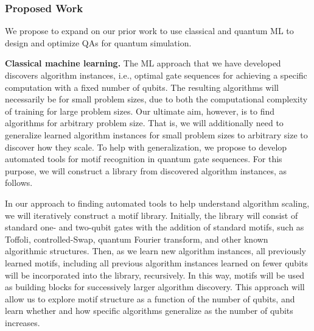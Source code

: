 \documentclass[11pt]{article}
\begin{document}



\subsubsection{Proposed Work} We propose to expand on our prior work to use classical and quantum ML to design and optimize QAs for quantum simulation.%


\textbf{Classical machine learning.} The ML approach that we have developed \cite{Cincio2018} discovers algorithm instances, i.e., optimal gate sequences for achieving a specific computation with a fixed number of qubits. The resulting algorithms will necessarily be for small problem sizes, due to both the computational complexity of training for large problem sizes. Our ultimate aim, however, is to find algorithms for arbitrary problem size. That is, we will additionally need to generalize learned algorithm instances for small problem sizes to arbitrary size to discover how they scale. To help with generalization, we propose to develop automated tools for motif recognition in quantum gate sequences. For this purpose, we will construct a library from discovered algorithm instances, as follows.

In our approach to finding automated tools to help understand algorithm scaling, we will iteratively construct a motif library. Initially, the library will consist of standard one- and two-qubit gates with the addition of standard motifs, such as Toffoli, controlled-Swap, quantum Fourier transform, and other known algorithmic structures. Then, as we learn new algorithm instances, all previously learned motifs, including all previous algorithm instances learned on fewer qubits will be incorporated into the library, recursively. In this way, motifs will be used as building blocks for successively larger algorithm discovery. This approach will allow us to explore motif structure as a function of the number of qubits, and learn whether and how specific algorithms generalize as the number of qubits increases.
\end{document}
